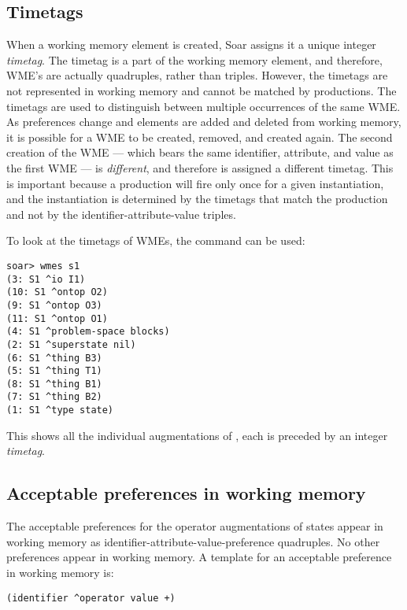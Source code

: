 \subsection{Timetags}

When a working memory element is created, Soar assigns it a unique
integer \textit{timetag}. The timetag is a part of the working memory
element, and therefore, WME's are actually quadruples, rather than
triples. However, the timetags are not represented in working memory and
cannot be matched by productions. The timetags are used to distinguish
between multiple occurrences of the same WME. As preferences change and
elements are added and deleted from working memory, it is possible for
a WME to be created, removed, and created again. The second creation of
the WME --- which bears the same identifier, attribute, and value as the
first WME --- is \textit{different}, and therefore is assigned a
different timetag. This is important because a production will fire only
once for a given instantiation, and the instantiation is determined by
the timetags that match the production and not by the
identifier-attribute-value triples.

To look at the timetags of WMEs, the  command can be used:
\begin{verbatim}
soar> wmes s1
(3: S1 ^io I1)
(10: S1 ^ontop O2)
(9: S1 ^ontop O3)
(11: S1 ^ontop O1)
(4: S1 ^problem-space blocks)
(2: S1 ^superstate nil)
(6: S1 ^thing B3)
(5: S1 ^thing T1)
(8: S1 ^thing B1)
(7: S1 ^thing B2)
(1: S1 ^type state)
\end{verbatim} \vspace{12pt}
This shows all the individual augmentations of , each is preceded by
an integer \textit{timetag}.

\subsection{Acceptable preferences in working memory}
\label{SYNTAX-wm-preferences}

The acceptable preferences for the operator augmentations of states
appear in working memory as identifier-attribute-value-preference
quadruples. No other preferences appear in working memory. A template
for an acceptable preference in working memory is:
\begin{verbatim}
(identifier ^operator value +)
\end{verbatim} \vspace{12pt}

